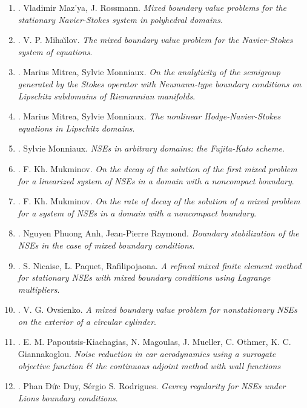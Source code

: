 \documentclass{article}
\begin{document}
\begin{enumerate}
	\item \cite{Mazya_Rossmann2009}. {\sc Vladimir Maz'ya, J. Rossmann}. {\it Mixed boundary value problems for the stationary Navier-Stokes system in polyhedral domains}.
	\item \cite{Mihailov1968}. {\sc V. P. Miha\u{\i}lov}. {\it The mixed boundary value problem for the Navier-Stokes system of equations}.
	\item \cite{Mitrea_Monniaux2008}. {\sc Marius Mitrea, Sylvie Monniaux}. {\it On the analyticity of the semigroup generated by the Stokes operator with Neumann-type boundary conditions on Lipschitz subdomains of Riemannian manifolds}.
	\item \cite{Mitrea_Monniaux2009}. {\sc Marius Mitrea, Sylvie Monniaux}. {\it The nonlinear Hodge-Navier-Stokes equations in Lipschitz domains}.
	\item \cite{Monniaux2006}. {\sc Sylvie Monniaux}. {\it NSEs in arbitrary domains: the Fujita-Kato scheme}.
	\item \cite{Mukminov1992a}. {\sc F. Kh. Mukminov}. {\it On the decay of the solution of the first mixed problem for a linearized system of NSEs in a domain with a noncompact boundary}.
	\item \cite{Mukminov1992b}. {\sc F. Kh. Mukminov}. {\it On the rate of decay of the solution of a mixed problem for a system of NSEs in a domain with a noncompact boundary}.
	\item \cite{Nguyen_Raymond2015}. {\sc Nguyen Phuong Anh, Jean-Pierre Raymond}. {\it Boundary stabilization of the NSEs in the case of mixed boundary conditions}.
	\item \cite{Nicaise_Paquet_Rafilipojaona2007}. {\sc S. Nicaise, L. Paquet, Rafilipojaona}. {\it A refined mixed finite element method for stationary NSEs with mixed boundary conditions using Lagrange multipliers}.
	\item \cite{Ovsienko1978}. {\sc V. G. Ovsienko}. {\it A mixed boundary value problem for nonstationary NSEs on the exterior of a circular cylinder}.
	\item \cite{Papoutsis-Kiachagias_Magoulas_Mueller_Othmer_Giannakoglou2015}. {\sc E. M. Papoutsis-Kiachagias, N. Magoulas, J. Mueller, C. Othmer, K. C. Giannakoglou}. {\it Noise reduction in car aerodynamics using a surrogate objective function \& the continuous adjoint method with wall functions}
	\item \cite{Phan_Sergio2017}. {\sc Phan Đức Duy, S\'{e}rgio S. Rodrigues}. {\it Gevrey regularity for NSEs under Lions boundary conditions}.

\end{enumerate}
\end{document}
